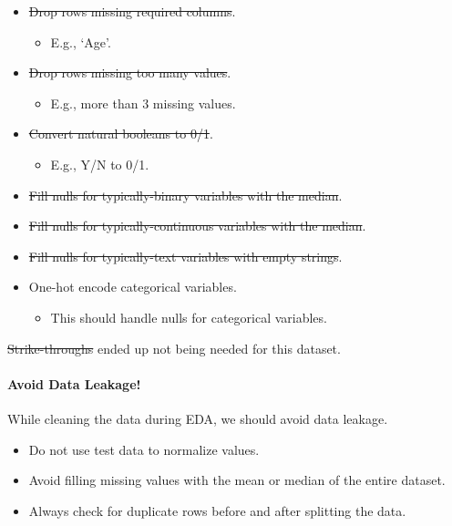 \documentclass[11pt]{article}
\providecommand{\tightlist}{%
      \setlength{\itemsep}{0pt}\setlength{\parskip}{0pt}}
\begin{document}
\begin{itemize}
\tightlist
\item
  \st{Drop rows missing required columns}.

  \begin{itemize}
  \tightlist
  \item
    E.g., `Age'.
  \end{itemize}
\item
  \st{Drop rows missing too many values}.

  \begin{itemize}
  \tightlist
  \item
    E.g., more than 3 missing values.
  \end{itemize}
\item
  \st{Convert natural booleans to 0/1}.

  \begin{itemize}
  \tightlist
  \item
    E.g., Y/N to 0/1.
  \end{itemize}
\item
  \st{Fill nulls for typically-binary variables with the median}.
\item
  \st{Fill nulls for typically-continuous variables with the median}.
\item
  \st{Fill nulls for typically-text variables with empty strings}.
\item
  One-hot encode categorical variables.

  \begin{itemize}
  \tightlist
  \item
    This should handle nulls for categorical variables.
  \end{itemize}
\end{itemize}

\st{Strike-throughs} ended up not being needed for this dataset.

\paragraph{Avoid Data Leakage!}\label{avoid-data-leakage}

While cleaning the data during EDA, we should avoid data leakage.

\begin{itemize}
\tightlist
\item
  Do not use test data to normalize values.
\item
  Avoid filling missing values with the mean or median of the entire
  dataset.
\item
  Always check for duplicate rows before and after splitting the data.
\end{itemize}
\end{document}
